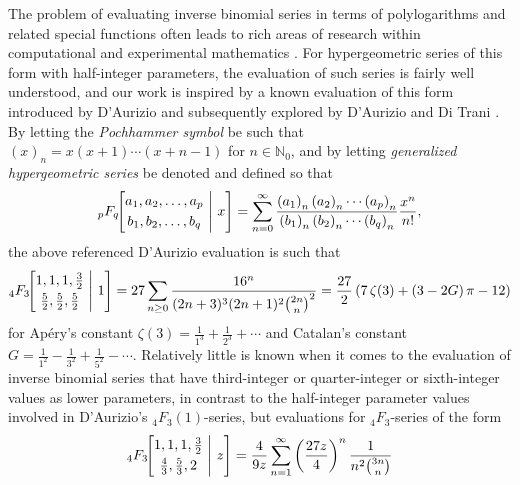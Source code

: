 \documentclass[12pt]{article}
\begin{document}
 The problem of evaluating inverse binomial series in terms of polylogarithms and related special functions often leads to rich areas of 
 research within computational and experimental mathematics \cite[\S1.7]{BorweinBaileyGirgensohn2004}. For hypergeometric series 
 of this form with half-integer parameters, the evaluation of such series is fairly well understood, and our work is inspired by a known 
 evaluation of this form introduced by D'Aurizio and subsequently explored by D'Aurizio and Di Trani \cite{DAurizioDiTrani2018}. By 
 letting the \emph{Pochhammer symbol} be such that $(x)_{n} = x(x+1) \cdots (x + n - 1)$ for $n \in \mathbb{N}_{0}$, and by letting 
 \emph{generalized hypergeometric series} be denoted and defined so that 
\begin{equation*}
 {}_{p}F_{q}\!\!\left[ \begin{matrix} a_{1}, a_{2}, \ldots, a_{p} \vspace{1mm}\\ b_{1}, b_{2}, \ldots, b_{q} \end{matrix} \ \Bigg| \ x 
 \right] = \sum_{n=0}^{\infty} \frac{ \left( a_{1} \right)_{n} \left( a_{2} \right)_{n} \cdots \left( a_{p} \right)_{n} }{ \left( b_{1} \right)_{n} 
 \left( b_{2} \right)_{n} \cdots \left( b_{q} \right)_{n} } \frac{x^{n}}{n!}, 
\end{equation*}
 the above referenced D'Aurizio evaluation is such that 
\begin{equation*}
 {}_{4}F_{3}\!\!\left[ \begin{matrix} 1, 1, 1, \frac{3}{2} \vspace{1mm}\\ \frac{5}{2}, \frac{5}{2}, \frac{5}{2} \end{matrix} \ \Bigg| \ 1 \right] = 
 27 \sum_{n\geq 0}\frac{16^n}{(2n+3)^3 (2n+1)^2 \binom{2n}{n}^2} = {\frac{27}{2}\left(7\,\zeta(3)+(3 - 
 2 G)\,\pi-12\right)} 
\end{equation*}
 for Ap\'{e}ry's constant $\zeta(3) = \frac{1}{1^3} + \frac{1}{2^3} + \cdots$ and Catalan's constant $G = \frac{1}{1^2} - \frac{1}{3^2} + 
 \frac{1}{5^2} - \cdots$. Relatively little is known when it comes to the evaluation of inverse binomial series that have third-integer 
 or quarter-integer or sixth-integer values as lower parameters, in contrast to the half-integer parameter values involved in D'Aurizio's 
 ${}_{4}F_{3}(1)$-series, but evaluations for ${}_{4}F_{3}$-series of the form 
\begin{equation}\label{4F3thirdinteger} 
 {}_{4}F_{3}\!\!\left[ \begin{matrix} 1, 1, 1, \frac{3}{2} \vspace{1mm}\\ 
 \frac{4}{3}, \frac{5}{3}, 2 \end{matrix} \ \Bigg| \ z \right] 
 = \frac{4}{9 z} \sum_{n=1}^{\infty} \left( \frac{27z}{4} \right)^{n} \frac{1}{n^2 \binom{3 n}{n}} 
\end{equation}
\end{document}

